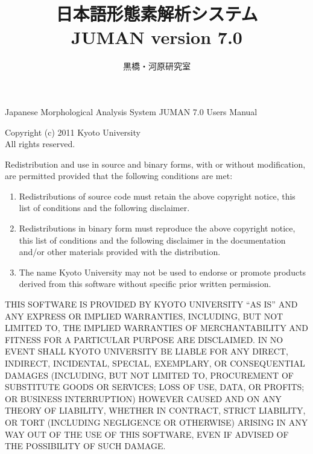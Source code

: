\documentclass[a4j,titlepage]{jarticle}
\title{\bf 日本語形態素解析システム \\ JUMAN version 7.0}
\author{黒橋・河原研究室}
\date{平成23年10月 \\
\rule{0mm}{110mm}Copyright \copyright\ 2011\begin{tabular}[t]{l}
                                京都大学大学院情報学研究科 \\
                                \end{tabular}
}
\begin{document}
\maketitle

\thispagestyle{empty}

\vspace*{\fill}

\begin{small}
\noindent
Japanese Morphological Analysis System JUMAN 7.0 Users Manual

\noindent
Copyright (c) 2011 Kyoto University \\
All rights reserved.

\noindent
Redistribution and use in source and binary forms, with or without
modification, are permitted provided that the following conditions
are met:

\begin{enumerate}
 \item Redistributions of source code must retain the above copyright
   notice, this list of conditions and the following disclaimer.
 \item Redistributions in binary form must reproduce the above copyright
   notice, this list of conditions and the following disclaimer in the
   documentation and/or other materials provided with the distribution.
 \item The name Kyoto University may not be used to endorse or promote
   products derived from this software without specific prior written
   permission.
\end{enumerate}

\noindent
THIS SOFTWARE IS PROVIDED BY KYOTO UNIVERSITY ``AS IS'' AND ANY
EXPRESS OR IMPLIED WARRANTIES, INCLUDING, BUT NOT LIMITED TO, THE
IMPLIED WARRANTIES OF MERCHANTABILITY AND FITNESS FOR A PARTICULAR
PURPOSE ARE DISCLAIMED.  IN NO EVENT SHALL KYOTO UNIVERSITY BE
LIABLE FOR ANY DIRECT, INDIRECT, INCIDENTAL, SPECIAL, EXEMPLARY, OR
CONSEQUENTIAL DAMAGES (INCLUDING, BUT NOT LIMITED TO, PROCUREMENT OF
SUBSTITUTE GOODS OR SERVICES; LOSS OF USE, DATA, OR PROFITS; OR BUSINESS
INTERRUPTION) HOWEVER CAUSED AND ON ANY THEORY OF LIABILITY, WHETHER IN
CONTRACT, STRICT LIABILITY, OR TORT (INCLUDING NEGLIGENCE OR OTHERWISE)
ARISING IN ANY WAY OUT OF THE USE OF THIS SOFTWARE, EVEN IF ADVISED OF
THE POSSIBILITY OF SUCH DAMAGE.


\vspace{1cm}


\end{small}
\end{document}
